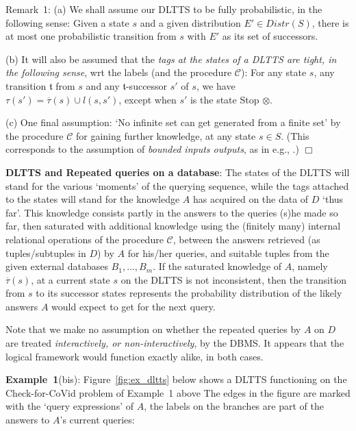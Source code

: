 \documentclass[pdflatex]{article}
\def \C {{\mathcal{C}}}
\def \t {{\mathfrak t}}
\def \lft {\noindent}
\def \otau {\overline{\tau}}
\begin{document}
  

 \vspace*{0.5mm}
{\sc  Remark}~1:
(a) We shall assume our DLTTS to be fully probabilistic, in the following sense:
 Given a state $s$ and a  given distribution  $E' \in Distr(S)$, there is at most
 one probabilistic  transition from $s$ with $E'$ as its set of successors.
 
 (b) It will also be assumed that the {\em tags at the states of a DLTTS are tight, in
   the  following sense}, wrt the labels (and the procedure $\C$): For  any state $s$,
 any  transition $\t$ from $s$ and any  $\t$-successor $s'$ of $s$, we have 
 $\tau(s') = \otau(s) \cup l(s, s')$, except  when $s'$ is the state Stop $\otimes$. 
   
 (c)  One final assumption: `No infinite set can get generated from a finite set'
 by the  procedure $\C$ for  gaining  further knowledge, at any state $s \in S$.
 (This corresponds  to the assumption of {\em bounded inputs outputs}, as  in e.g.,
 \cite{BarthePOPL12,BartheLICS20}.)                  \hfill$\Box$
 
 \vspace*{1mm}
 {\bf DLTTS and Repeated queries on a database}: 
 The states of the DLTTS will stand for the  various  `moments'  of the querying sequence,
 while the  tags attached to the states  will stand for the knowledge $A$ has acquired
 on the  data of $D$ `thus far'.  This knowledge consists partly in the answers to  the
 queries (s)he  made so far,  then saturated  with additional knowledge  using the
 (finitely many) internal relational operations of the procedure $\C$, between the
 answers retrieved (as  tuples/subtuples in $D$) by $A$ for his/her queries,
 and suitable tuples from the given external  databases $B_1, \dots, B_m$.
 If the saturated knowledge of $A$,  namely $\otau(s)$, at a current state $s$ on the
 DLTTS is not inconsistent, then the  transition  from  $s$  to  its successor  states
 represents the probability distribution of the likely  answers  $A$  would  expect
 to get for the next query.
 
 Note that we make no assumption on whether the repeated queries by  $A$ on
 $D$  are treated {\em interactively, or non-interactively}, by the DBMS.  It appears 
 that the logical framework would function exactly alike, in both cases. 

 \lft
  {\bf Example~1}(bis):  Figure~\ref{fig:ex_dltts}  below shows a DLTTS functioning
  on   the   Check-for-CoVid problem of Example~1  above  The edges in the figure are
  marked  with the `query expressions' of $A$, the labels on the branches are part
  of the  answers to $A$'s current queries: 
     
\end{document}
